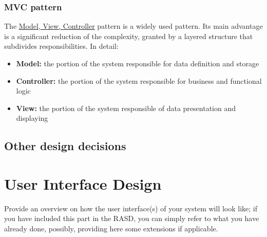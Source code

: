 \documentclass{article}
\newcommand{\link}[2]{{\color{blue}\underline{\href{#1}{#2}}}}
\begin{document}
		\subsubsection{MVC pattern}
			The \link{https://en.wikipedia.org/wiki/Model-view-controller}{Model, View, Controller} pattern is a widely 
			used pattern. Its main advantage is a significant reduction of the complexity, granted by a layered
			structure that subdivides responsibilities. In detail:
			\begin{itemize}
				\item \textbf{Model:} the portion of the  system responsible for data definition and storage
				\item \textbf{Controller:} the portion of the system responsible for business and functional logic
				\item \textbf{View:} the portion of the system responsible of data presentation and displaying
			\end{itemize}
	\subsection{Other design decisions}
\newpage
\section{User Interface Design}Provide	an	overview	on	how	the	user	interface(s)	of	your	system	will	
look	like; if	you	 have	included	 this	 part	in	 the	 RASD,	you	 can	 simply	 refer	 to	what	you	 have	
already	done,	possibly,	providing	here	some	extensions	if	applicable.
	\FloatBarrier
\end{document}
